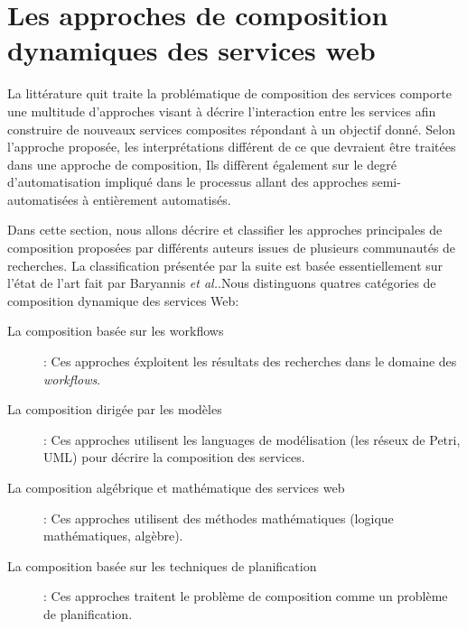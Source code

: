 

  \section{Les approches de composition dynamiques des services web}
  \label{sec:comp-dynam}

  La littérature quit traite la problématique de composition des
  services comporte une multitude d'approches visant à décrire
  l'interaction entre les services afin construire de nouveaux
  services composites répondant à un objectif donné. Selon l'approche
  proposée, les interprétations différent de ce que devraient être
  traitées dans une approche de composition, Ils diffèrent également
  sur le degré d'automatisation impliqué dans le processus allant des
  approches semi-automatisées à entièrement automatisés.

  Dans cette section, nous allons décrire et classifier les approches
  principales de composition proposées par différents auteurs issues
  de plusieurs communautés de recherches. La classification présentée
  par la suite est basée essentiellement sur l'état de l'art fait par
  Baryannis \emph{et al.}\cite{baryannis2010}.Nous distinguons quatres
  catégories de composition dynamique des services Web:
  \SpecialItem
  \begin{description}
  \item[La composition  basée sur les workflows]: Ces approches
    éxploitent les résultats des recherches dans le domaine des
    \textit{workflows}.

  \item[La composition dirigée par les modèles]: Ces approches
    utilisent les languages de modélisation (les réseux de Petri,
    \textsc{UML}) pour décrire la composition des services.

  \item[La composition algébrique et mathématique des services web]:
    Ces approches utilisent des méthodes mathématiques (logique
    mathématiques, algèbre).

  \item[La composition basée sur les techniques de planification]: Ces
    approches traitent le problème de composition comme un problème de
    planification.
  \end{description}
  \newpage
